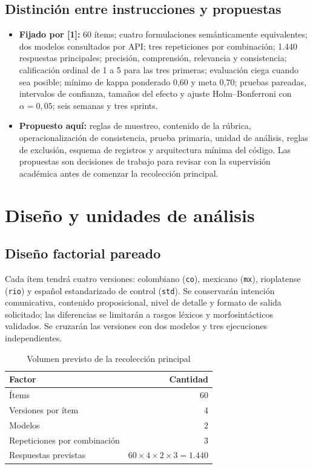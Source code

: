 \documentclass[conference]{IEEEtran}
\begin{document}
\subsection{Distinción entre instrucciones y propuestas}
\begin{itemize}[leftmargin=*]
\item \textbf{Fijado por [1]:} 60 ítems; cuatro formulaciones semánticamente equivalentes; dos modelos consultados por API; tres repeticiones por combinación; 1.440 respuestas principales; precisión, comprensión, relevancia y consistencia; calificación ordinal de 1 a 5 para las tres primeras; evaluación ciega cuando sea posible; mínimo de kappa ponderado 0,60 y meta 0,70; pruebas pareadas, intervalos de confianza, tamaños del efecto y ajuste Holm--Bonferroni con $\alpha=0{,}05$; seis semanas y tres sprints.
\item \textbf{Propuesto aquí:} reglas de muestreo, contenido de la rúbrica, operacionalización de consistencia, prueba primaria, unidad de análisis, reglas de exclusión, esquema de registros y arquitectura mínima del código. Las propuestas son decisiones de trabajo para revisar con la supervisión académica antes de comenzar la recolección principal.
\end{itemize}

\section{Diseño y unidades de análisis}
\subsection{Diseño factorial pareado}
Cada ítem tendrá cuatro versiones: colombiano (\texttt{co}), mexicano (\texttt{mx}), rioplatense (\texttt{rio}) y español estandarizado de control (\texttt{std}). Se conservarán intención comunicativa, contenido proposicional, nivel de detalle y formato de salida solicitado; las diferencias se limitarán a rasgos léxicos y morfosintácticos validados. Se cruzarán las versiones con dos modelos y tres ejecuciones independientes.

\begin{table}[ht]
\caption{Volumen previsto de la recolección principal}
\label{tab:volume}
\centering
\begin{tabular}{lr}
\toprule
Factor & Cantidad \\
\midrule
Ítems & 60 \\
Versiones por ítem & 4 \\
Modelos & 2 \\
Repeticiones por combinación & 3 \\
Respuestas previstas & $60\times4\times2\times3=1.440$ \\
\bottomrule
\end{tabular}
\end{table}
\end{document}
